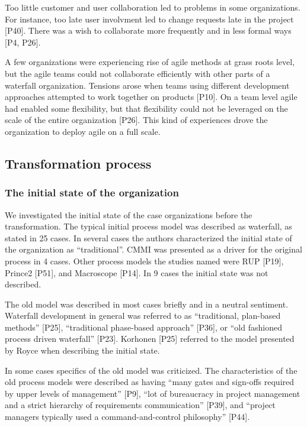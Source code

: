 \documentclass[preprint,authoryear,12pt]{elsarticle}
\begin{document}
Too little customer and user collaboration led to problems in some
organizations. For instance, too late user involvment led to change requests
late in the project [P40]. There was a wish to collaborate more frequently and
in less formal ways [P4, P26].


A few organizations were experiencing rise of agile methods at grass roots
level, but the agile teams could not collaborate efficiently with other parts of
a waterfall organization. Tensions arose when teams using different development
approaches attempted to work together on products [P10]. On a team level agile
had enabled some flexibility, but that flexibility could not be leveraged on the
scale of the entire organization [P26]. This kind of experiences drove the
organization to deploy agile on a full scale.


\subsection{Transformation process}

\subsubsection{The initial state of the organization}

We investigated the initial state of the case organizations before the
transformation. The typical initial process model was described as waterfall, as
stated in 25 cases. In several cases the authors characterized the initial state
of the organization as ``traditional''. CMMI was presented as a driver for the
original process in 4 cases. Other process models the studies named were RUP
[P19], Prince2 [P51], and Macroscope [P14]. In 9 cases the initial state was not
described.

The old model was described in most cases briefly and in a neutral sentiment.
Waterfall development in general was referred to as ``traditional, plan-based
methods'' [P25], ``traditional phase-based approach'' [P36], or ``old fashioned
process driven waterfall'' [P23]. Korhonen [P25] referred to the model presented
by Royce \cite{Royce1970} when describing the initial state.

In some cases specifics of the old model was criticized. The characteristics of
the old process models were described as having ``many gates and sign-offs
required by upper levels of management'' [P9], ``lot of bureaucracy in project
management and a strict hierarchy of requirements communication'' [P39], and
``project managers typically used a command-and-control philosophy'' [P44].
\end{document}
